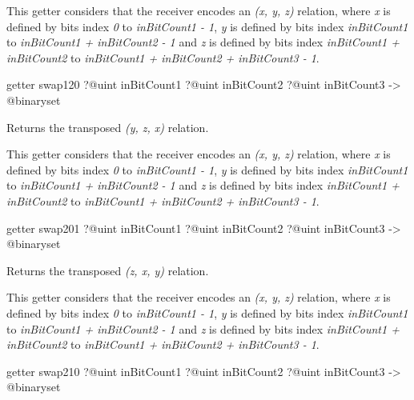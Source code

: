This getter considers that the receiver encodes an \emph{(x, y, z)} relation, where \emph{x} is defined by bits index \emph{0} to \emph{inBitCount1  - 1}, \emph{y} is defined by bits index \emph{inBitCount1} to \emph{inBitCount1 + inBitCount2 - 1} and  \emph{z} is defined by bits index \emph{inBitCount1 + inBitCount2} to \emph{inBitCount1 + inBitCount2 + inBitCount3 - 1}.







\begin{galgasbox}
getter swap120
  ?@uint inBitCount1
  ?@uint inBitCount2
  ?@uint inBitCount3
  -> @binaryset
\end{galgasbox}

Returns the transposed \emph{(y, z, x)} relation.

This getter considers that the receiver encodes an \emph{(x, y, z)} relation, where \emph{x} is defined by bits index \emph{0} to \emph{inBitCount1  - 1}, \emph{y} is defined by bits index \emph{inBitCount1} to \emph{inBitCount1 + inBitCount2 - 1} and  \emph{z} is defined by bits index \emph{inBitCount1 + inBitCount2} to \emph{inBitCount1 + inBitCount2 + inBitCount3 - 1}.







\begin{galgasbox}
getter swap201
  ?@uint inBitCount1
  ?@uint inBitCount2
  ?@uint inBitCount3
  -> @binaryset
\end{galgasbox}

Returns the transposed \emph{(z, x, y)} relation.

This getter considers that the receiver encodes an \emph{(x, y, z)} relation, where \emph{x} is defined by bits index \emph{0} to \emph{inBitCount1  - 1}, \emph{y} is defined by bits index \emph{inBitCount1} to \emph{inBitCount1 + inBitCount2 - 1} and  \emph{z} is defined by bits index \emph{inBitCount1 + inBitCount2} to \emph{inBitCount1 + inBitCount2 + inBitCount3 - 1}.







\begin{galgasbox}
getter swap210
  ?@uint inBitCount1
  ?@uint inBitCount2
  ?@uint inBitCount3
  -> @binaryset
\end{galgasbox}

